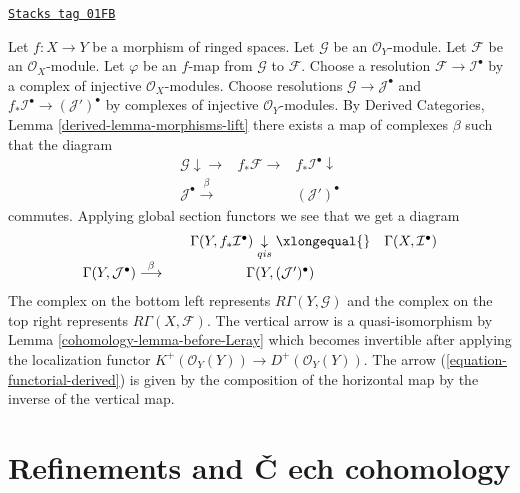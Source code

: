 \begin{remark}
\label{cohomology-remark-explain-arrow}
\href{https://stacks.math.columbia.edu/tag/01FB}{\texttt{Stacks tag 01FB}}

Let $f : X \to Y$ be a morphism of ringed spaces.
Let $\mathcal{G}$ be an $\mathcal{O}_Y$-module.
Let $\mathcal{F}$ be an $\mathcal{O}_X$-module.
Let $\varphi$ be an $f$-map from $\mathcal{G}$ to $\mathcal{F}$.
Choose a resolution $\mathcal{F} \to \mathcal{I}^\bullet$
by a complex of injective $\mathcal{O}_X$-modules.
Choose resolutions $\mathcal{G} \to \mathcal{J}^\bullet$ and
$f_*\mathcal{I}^\bullet \to (\mathcal{J}')^\bullet$ by complexes
of injective $\mathcal{O}_Y$-modules. By
Derived Categories, Lemma \ref{derived-lemma-morphisms-lift}
there exists a map of complexes
$\beta$ such that the diagram
\begin{equation}
\label{equation-choice}
\begin{array}{ccc}\mathcal{G} \downarrow\longrightarrow & f_*\mathcal{F} \longrightarrow & f_*\mathcal{I}^\bullet \downarrow \\ \mathcal{J}^\bullet \overset{\beta}{\longrightarrow} &  & (\mathcal{J}')^\bullet\end{array}
\end{equation}
commutes. Applying global section functors we see
that we get a diagram
$$
\begin{array}{cccc} &  & \Gamma(Y, f_*\mathcal{I}^\bullet) \underset{qis}{\downarrow}\xlongequal{} & \Gamma(X, \mathcal{I}^\bullet) \\ \Gamma(Y, \mathcal{J}^\bullet) \overset{\beta}{\longrightarrow} &  & \Gamma(Y, (\mathcal{J}')^\bullet) & \end{array}
$$
The complex on the bottom left represents $R\Gamma(Y, \mathcal{G})$
and the complex on the top right represents $R\Gamma(X, \mathcal{F})$.
The vertical arrow is a quasi-isomorphism by
Lemma \ref{cohomology-lemma-before-Leray} which becomes invertible after
applying the localization functor
$K^{+}(\mathcal{O}_Y(Y)) \to D^{+}(\mathcal{O}_Y(Y))$.
The arrow (\ref{equation-functorial-derived}) is given by the
composition of the horizontal map by the inverse of the vertical map.
\end{remark}

\section{Refinements and {\v C}
ech cohomology}
\label{cohomology-section-refinements-cech}

